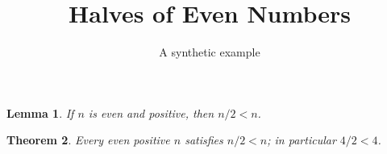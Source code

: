 \documentclass[11pt]{article}
\title{Halves of Even Numbers}
\author{A synthetic example}
\date{}
\newtheorem{theorem}{Theorem}
\newtheorem{lemma}[theorem]{Lemma}
\newcommand{\lean}[1]{}
\begin{document}
\maketitle

\begin{lemma}\label{lem:half}\lean{Uses.half_lt}
If $n$ is even and positive, then $n/2 < n$.
\end{lemma}

\begin{theorem}\label{thm:main}\lean{Uses.main_bound}
Every even positive $n$ satisfies $n/2 < n$; in particular $4/2 < 4$.
\end{theorem}
\end{document}
